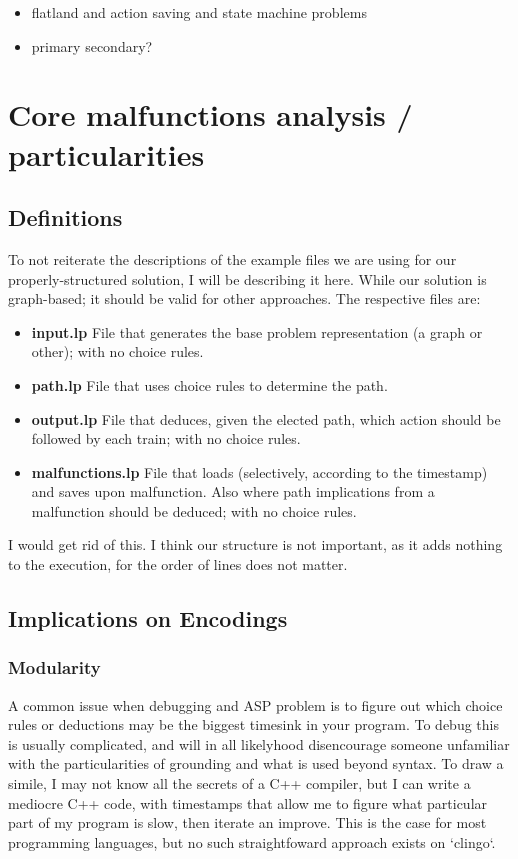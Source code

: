 \documentclass{llncs}
\begin{document}
\color{blue}
\begin{itemize}
	\item flatland and action saving and state machine problems
	\item primary secondary?
\end{itemize}
\color{black}

\section{Core malfunctions analysis / particularities}

\color{green}
\subsection{Definitions}
To not reiterate the descriptions of the example files we are using for our properly-structured solution, I will be describing it here. While our solution is graph-based; it should be valid for other approaches. The respective files are:
\begin{itemize}
	\item  \textbf{input.lp} File that generates the base problem representation (a graph or other); with no choice rules.
	\item  \textbf{path.lp} File that uses choice rules to determine the path.
	\item  \textbf{output.lp} File that deduces, given the elected path, which action should be followed by each train; with no choice rules.
	\item  \textbf{malfunctions.lp} File that loads (selectively, according to the timestamp) and saves upon malfunction. Also where path implications from a malfunction should be deduced; with no choice rules.
\end{itemize}
\color{black} \color{gray} I would get rid of this. I think our structure is not important, as it adds nothing to the execution, for the order of lines does not matter. \color{black}

\subsection{Implications on Encodings}
\color{green}
\subsubsection{Modularity}
A common issue when debugging and ASP problem is to figure out which choice rules or deductions may be the biggest timesink in your program. To debug this is usually complicated, and will in all likelyhood disencourage someone unfamiliar with the particularities of grounding and what is used beyond syntax. To draw a simile, I may not know all the secrets of a C++ compiler, but I can write a mediocre C++ code, with timestamps that allow me to figure what particular part of my program is slow, then iterate an improve. This is the case for most programming languages, but no such straightfoward approach exists on `clingo`.
\end{document}
